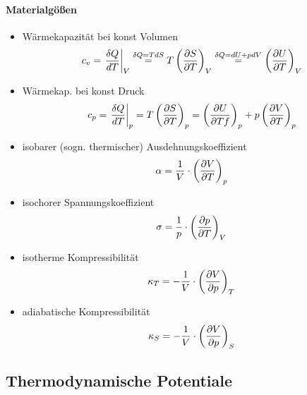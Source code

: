 \paragraph{Materialgößen}
\begin{itemize}
    \item Wärmekapazität bei konst Volumen
        \begin{align}
            c_v = \eval{\frac{\delta Q}{dT}}_V \overset{\delta Q=TdS}{=} T\left(\pd{S}{T}\right)_{V} \overset{\delta Q = dU + pdV}{=} \left(\pd{U}{T}\right)_{V}
        \end{align}
    \item Wärmekap. bei konst Druck
        \begin{align}
            c_p = \eval{\frac{\delta Q}{dT}}_p = T\left(\pd{S}{T}\right)_{p} = \left(\pd{U}{Tf}\right)_{p} + p\left(\pd{V}{T}\right)_{p}
        \end{align}
    \item isobarer (sogn. thermischer) Ausdehnungskoeffizient
    \begin{equation}
        \alpha = \frac{1}{V} \cdot \left( \frac{\partial V}{\partial T}\right)_p
    \end{equation}
    \item isochorer Spannungskoeffizient
    \begin{equation}
        \sigma = \frac{1}{p} \cdot \left(\frac{\partial p}{\partial T}\right)_V
    \end{equation}
    \item isotherme Kompressibilität
    \begin{equation}
        \kappa_T = - \frac{1}{V}\cdot \left(\frac{\partial V}{\partial p}\right)_T
    \end{equation}
    \item adiabatische Kompressibilität
    \begin{equation}
        \kappa_S = - \frac{1}{V} \cdot \left(\frac{\partial V}{\partial p}\right)_S
    \end{equation}

\end{itemize}

\newpage 
\subsection{Thermodynamische Potentiale}

